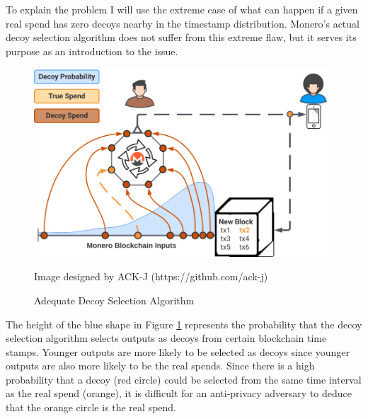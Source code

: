 \documentclass[english]{article}
\begin{document}
To explain the problem I will use the extreme case of what can happen
if a given real spend has zero decoys nearby in the timestamp distribution.
Monero's actual decoy selection algorithm does not suffer from this
extreme flaw, but it serves its purpose as an introduction to the
issue.

\begin{figure}[H]
\caption{Adequate Decoy Selection Algorithm}

\begin{centering}
\includegraphics[scale=0.4]{images/decoy-selection-with-adequate-DSA}
\par\end{centering}
\begin{centering}
{\footnotesize{}Image designed by ACK-J (https://github.com/ack-j)}{\footnotesize\par}
\par\end{centering}
\label{figure-adequate-dsa}
\end{figure}

The height of the blue shape in Figure \ref{figure-adequate-dsa}
represents the probability that the decoy selection algorithm selects
outputs as decoys from certain blockchain time stamps. Younger outputs
are more likely to be selected as decoys since younger outputs are
also more likely to be the real spends. Since there is a high probability
that a decoy (red circle) could be selected from the same time interval
as the real spend (orange), it is difficult for an anti-privacy adversary
to deduce that the orange circle is the real spend.
\end{document}
